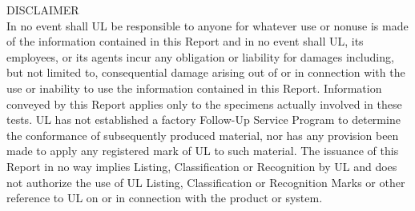 \documentclass{article}
\begin{document}
\clearpage

\begin{center}
DISCLAIMER\\
\vspace*{\baselineskip}
In no event shall UL be responsible to anyone for whatever use or nonuse is made of the information contained in this Report and in no event shall UL, its employees, or its agents incur any obligation or liability for damages including, but not limited to, consequential damage arising out of or in connection  with the use or inability to use the information contained in this Report. Information conveyed by this Report applies only to the specimens actually involved in these tests. UL has not established a factory Follow-Up Service Program to determine the conformance of subsequently produced material, nor has any provision been made to apply any registered mark of UL to such material. The issuance of this Report in no way implies Listing, Classification or Recognition by UL and does not authorize the use of UL Listing, Classification or Recognition Marks or other reference to UL on or in connection with the product or system.
\end{center}

\clearpage

\renewcommand{\abstractname}{Executive Summary}
\setlength{\emergencystretch}{5pt}
\end{document}

